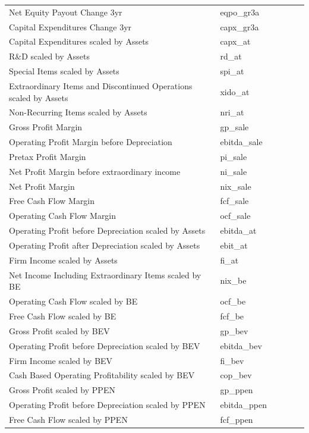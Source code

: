 \documentclass[12pt,title,fleqn]{article}
\begin{document}
\begin{longtable}{p{5cm}p{2cm}p{5cm}lll}
Net Equity Payout Change 3yr & eqpo\_gr3a & & & & \\
Capital Expenditures Change 3yr & capx\_gr3a & & & & \\
Capital Expenditures scaled by Assets & capx\_at & & & & \\
R\&D scaled by Assets & rd\_at & & & & \\
Special Items scaled by Assets & spi\_at & & & & \\
Extraordinary Items and Discontinued Operations scaled by Assets & xido\_at & & & & \\
Non-Recurring Items scaled by Assets & nri\_at & & & & \\
Gross Profit Margin & gp\_sale & & & & \\
Operating Profit Margin before Depreciation & ebitda\_sale & & & & \\
Pretax Profit Margin & pi\_sale & & & & \\
Net Profit Margin before extraordinary income & ni\_sale & & & & \\
Net Profit Margin & nix\_sale & & & & \\
Free Cash Flow Margin & fcf\_sale & & & & \\
Operating Cash Flow Margin & ocf\_sale & & & & \\
Operating Profit before Depreciation scaled by Assets & ebitda\_at & & & & \\
Operating Profit after Depreciation scaled by Assets & ebit\_at & & & & \\
Firm Income scaled by Assets & fi\_at & & & & \\
Net Income Including Extraordinary Items scaled by BE & nix\_be & & & & \\
Operating Cash Flow scaled by BE & ocf\_be & & & & \\
Free Cash Flow scaled by BE & fcf\_be & & & & \\
Gross Profit scaled by BEV & gp\_bev & & & & \\
Operating Profit before Depreciation scaled by BEV & ebitda\_bev & & & & \\
Firm Income scaled by BEV & fi\_bev & & & & \\
Cash Based Operating Profitability scaled by BEV & cop\_bev & & & & \\
Gross Profit scaled by PPEN & gp\_ppen & & & & \\
Operating Profit before Depreciation scaled by PPEN & ebitda\_ppen & & & & \\
Free Cash Flow scaled by PPEN & fcf\_ppen & & & & \\

\end{longtable}
\end{document}
